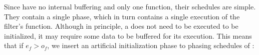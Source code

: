 \begin{comment}
\begin{displaymath} \small
P_p = \left\{
\begin{array}{c}
T_p = \left\{
\begin{array}{c}
A_{p,0} = \left\{ \{\{3A\}A_{sj,0}\ B\}, \left[\begin{array}{c} 18 \\ 18 \\ 10 \end{array}\right]\right\}, \\
A_{p,1} = \left\{ \{\{2A\}A_{sj,1}\ B\}, \left[\begin{array}{c} 12 \\ 12 \\ 10 \end{array}\right]\right\}, \\
A_{p,2} = \left\{ \{\{3A\}A_{sj,0}\ B\}, \left[\begin{array}{c} 18 \\ 18 \\ 10 \end{array}\right]\right\}, \\
A_{p,3} = \left\{ \{A\ A_{sj,1}\ B\}, \left[\begin{array}{c} 6 \\ 6 \\ 10 \end{array}\right]\right\} \\
\end{array}\right\}, \\
I_p = \left\{ \right\}, \\
c_p = \left[ \begin{array}{c} 54 \\ 54 \\ 40 \end{array} \right],
c^i_p = \left[ \begin{array}{c} 0 \\ 0 \\ 0 \end{array} \right]
\end{array}
\right\}
\end{displaymath}
\end{comment}

\subsubsection{\filter}

Since {\filters} have no internal buffering and only one {\work}
function, their schedules are simple.  They contain a single
phase, which in turn contains a single execution of the filter's
{\work} function.  Although in principle, a {\filter} does not need to
be executed to be initialized, it may require some data to be
buffered for its execution.  This means that if $e_f > o_f$, we
insert an artificial initialization phase to phasing schedules of
{\filters}:

